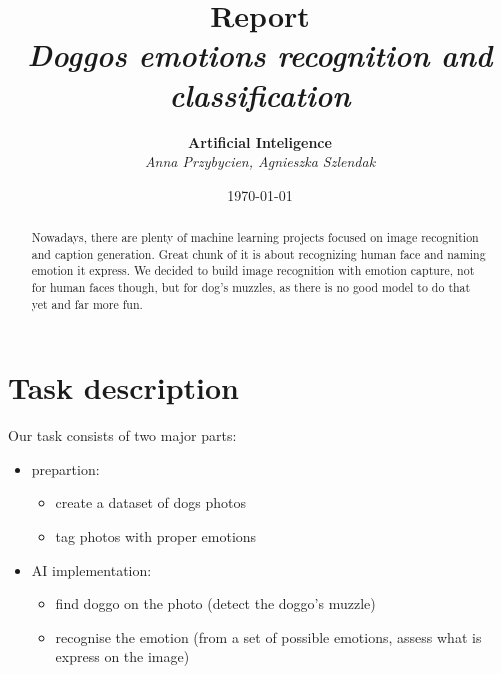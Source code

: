 \documentclass[11pt]{diazessay} %
\title{\textbf{Report} \\ {\Large\itshape Doggos emotions recognition and classification}} %
\author{\textbf{Artificial Inteligence} \\ \textit{Anna Przybycien, Agnieszka Szlendak}} %
\date{\today} %
\begin{document}
\maketitle %



\begin{abstract}
Nowadays, there are plenty of machine learning projects focused on image recognition and caption generation. Great chunk of it is about recognizing human face and naming emotion it express. We decided to build image recognition with emotion capture, not for human faces though, but for dog's muzzles, as there is no good model to do that yet and far more fun.
\end{abstract}


\vspace{10pt} %


\section*{Task description}

Our task consists of two major parts:

\begin{itemize}
	\item prepartion:

	\begin{itemize}
		\item create a dataset of dogs photos
		\item tag photos with proper emotions
	\end{itemize}

	\item AI implementation:
	\begin{itemize}
		\item find doggo on the photo (detect the doggo's muzzle)
		\item recognise the emotion (from a set of possible emotions, assess what is express on the image)
	\end{itemize}

\end{itemize}
\end{document}
